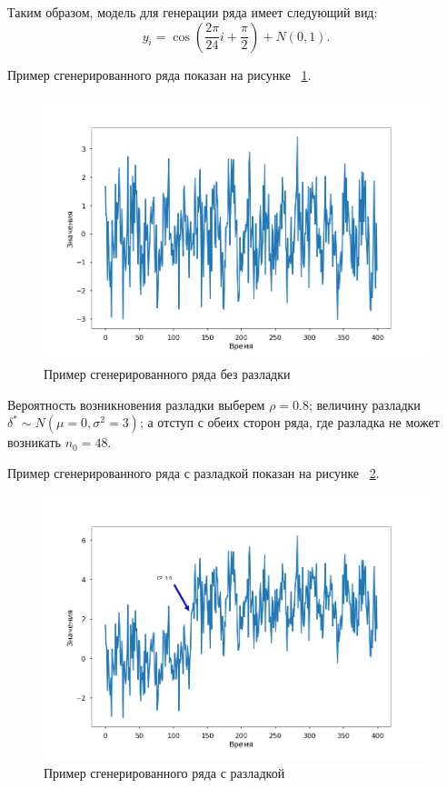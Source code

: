 \documentclass[%
12pt,
master,  %
natbib,      %
subf,        %
substylefile = spbu.rtx,
href,        %
colorlinks,  %
]{disser}
\begin{document}
Таким образом, модель для генерации ряда имеет следующий вид:
$$ y_i = \cos(\frac{2\pi}{24}i + \frac{\pi}{2}) + N(0,1).$$

Пример сгенерированного ряда показан на рисунке ~\ref{fig:data_modeling_example_1}.

\begin{figure}[!hhh]
	\begin{center}
		\includegraphics[width=12cm]{data_modeling_example_1}
	\end{center}
	\vspace{-5mm}\caption{Пример сгенерированного ряда без разладки}
	\label{fig:data_modeling_example_1}
\end{figure}

Вероятность возникновения разладки выберем $\rho = 0.8$; величину разладки $\delta^* \sim N(\mu = 0,\sigma^2 = 3)$; а отступ с обеих сторон ряда, где разладка не может возникать $n_0 = 48$.

Пример сгенерированного ряда с разладкой показан на рисунке ~\ref{fig:data_modeling_example_2}.

\begin{figure}[!hhh]
	\begin{center}
		\includegraphics[width=12cm]{data_modeling_example_2}
	\end{center}
	\vspace{-5mm}\caption{Пример сгенерированного ряда с разладкой}
	\label{fig:data_modeling_example_2}
\end{figure}
\end{document}
